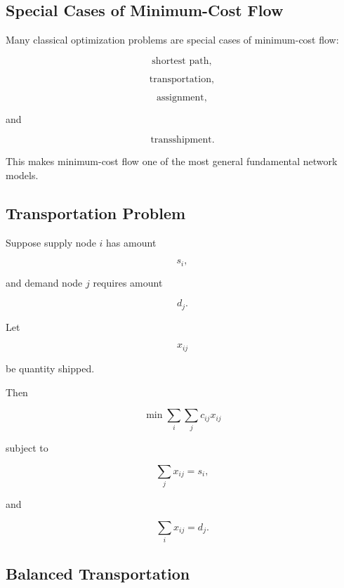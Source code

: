 \subsection{Special Cases of Minimum-Cost Flow}
\label{subsec:min-cost-flow-special-cases}

Many classical optimization problems are special cases of minimum-cost
flow:

\[
\boxed{
\text{shortest path},
}
\]

\[
\boxed{
\text{transportation},
}
\]

\[
\boxed{
\text{assignment},
}
\]

and

\[
\boxed{
\text{transshipment}.
}
\]

This makes minimum-cost flow one of the most general fundamental network
models.

\subsection{Transportation Problem}
\label{subsec:network-transportation}

Suppose supply node \(i\) has amount

\[
s_i,
\]

and demand node \(j\) requires amount

\[
d_j.
\]

Let

\[
x_{ij}
\]

be quantity shipped.

Then

\[
\boxed{
\min
\sum_i
\sum_j
c_{ij}x_{ij}
}
\]

subject to

\[
\boxed{
\sum_jx_{ij}=s_i,
}
\]

and

\[
\boxed{
\sum_ix_{ij}=d_j.
}
\]

\subsection{Balanced Transportation}
\label{subsec:balanced-transportation}

